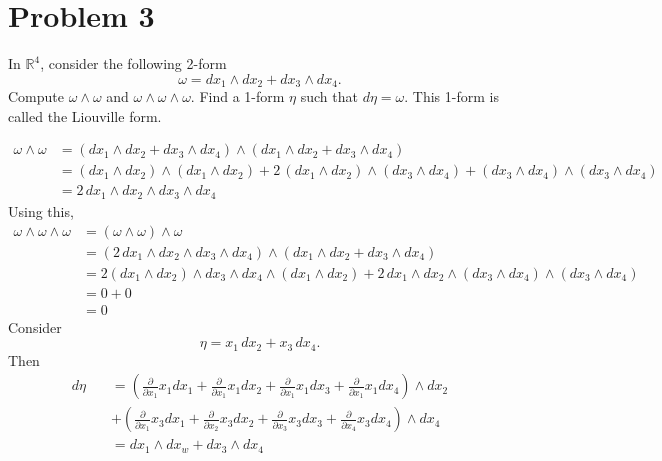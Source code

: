 \documentclass[11pt]{article}
\begin{document}
\section*{Problem 3}
In $\mathbb{R}^4$, consider the following 2-form 
\[ \omega = dx_1 \wedge dx_2 + dx_3 \wedge dx_4. \]
Compute $\omega \wedge \omega$ and $\omega \wedge \omega \wedge \omega$. Find a 1-form $\eta$ such that $d\eta = \omega$. This 1-form is called the Liouville form.
\begin{solution}
    \begin{align*}
        \omega\wedge \omega &= (dx_1 \wedge dx_2 + dx_3 \wedge dx_4) \wedge(dx_1 \wedge dx_2 + dx_3 \wedge dx_4) \\
        &= (dx_1 \wedge dx_2)\wedge (dx_1 \wedge dx_2) + 2\,(dx_1 \wedge dx_2)\wedge (dx_3 \wedge dx_4)+ (dx_3 \wedge dx_4)\wedge (dx_3 \wedge dx_4)\\
        &= 2 \,dx_1 \wedge dx_2 \wedge dx_3 \wedge dx_4
    \end{align*}
    Using this, 
    \begin{align*}
        \omega \wedge \omega \wedge \omega &= (\omega \wedge \omega) \wedge \omega\\
        &= (2 \,dx_1 \wedge dx_2 \wedge dx_3 \wedge dx_4) \wedge (dx_1 \wedge dx_2 + dx_3 \wedge dx_4)\\
        &= 2(dx_1 \wedge dx_2) \wedge dx_3 \wedge dx_4 \wedge (dx_1 \wedge dx_2) + 2\,dx_1 \wedge dx_2 \wedge (dx_3 \wedge dx_4) \wedge (dx_3 \wedge dx_4)\\
        &= 0 + 0\\
        &= 0
    \end{align*}
    Consider 
    \[\eta = x_1 \,dx_2 + x_3 \, dx_4.\]
    Then 
    \begin{align*}
        d\eta &= \left(\frac{\partial }{\partial x_1}x_1 dx_1 +   \frac{\partial }{\partial x_1}x_1 dx_2 + \frac{\partial }{\partial x_1}x_1 dx_3 + \frac{\partial }{\partial x_1}x_1 dx_4\right)\wedge dx_2\\
        \qquad &+ \left(\frac{\partial }{\partial x_1}x_3 dx_1 +   \frac{\partial }{\partial x_2}x_3 dx_2 + \frac{\partial }{\partial x_3}x_3 dx_3 + \frac{\partial }{\partial x_4}x_3 dx_4\right)\wedge dx_4\\
        &= dx_1 \wedge dx_w + dx_3 \wedge dx_4
    \end{align*}
\end{solution}
\end{document}

